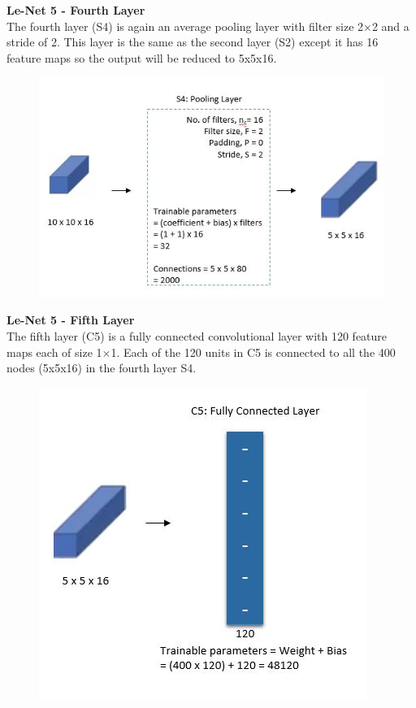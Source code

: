 \documentclass[10pt, compress]{beamer}
\begin{document}
\begin{frame}
  \vspace{0.6cm}
  \textbf{Le-Net 5 - Fourth Layer} \\
  The fourth layer (S4) is again an average pooling layer with filter size 2×2 and a stride of 2. This layer is the same as the second layer (S2) except it has 16 feature maps so the output will be reduced to 5x5x16.
  \begin{figure}
    \includegraphics[width=.75\linewidth]{imgs/cnn/LeNet_Layer4}
  \end{figure}
\end{frame}

\begin{frame}
  \vspace{0.6cm}
  \textbf{Le-Net 5 - Fifth Layer} \\
  The fifth layer (C5) is a fully connected convolutional layer with 120 feature maps each of size 1×1. Each of the 120 units in C5 is connected to all the 400 nodes (5x5x16) in the fourth layer S4.
  \begin{figure}
    \includegraphics[width=.65\linewidth]{imgs/cnn/LeNet_Layer5}
  \end{figure}
\end{frame}
\end{document}
